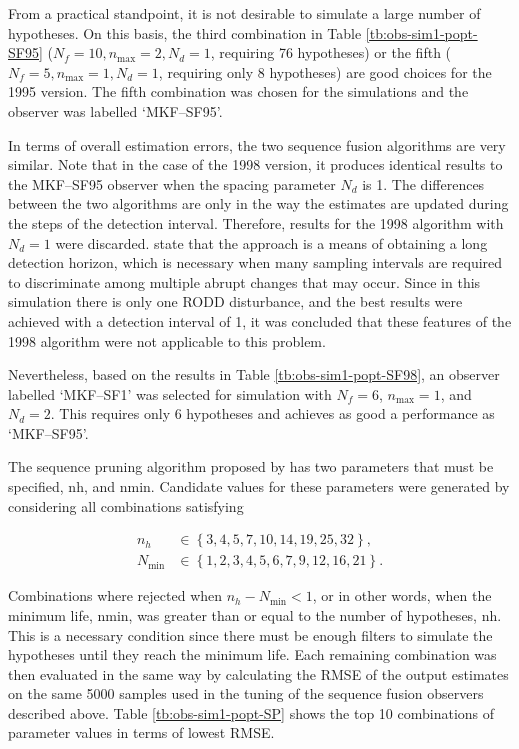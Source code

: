 From a practical standpoint, it is not desirable to simulate a large number of hypotheses. On this basis, the third combination in Table \ref{tb:obs-sim1-popt-SF95} ($N_f=10,n_\text{max}=2,N_d=1$, requiring 76 hypotheses) or the fifth ($N_f=5,n_\text{max}=1,N_d=1$, requiring only 8 hypotheses) are good choices for the 1995 version. The fifth combination was chosen for the simulations and the observer was labelled `MKF--SF95'. 

In terms of overall estimation errors, the two sequence fusion algorithms are very similar. Note that in the case of the 1998 version, it produces identical results to the MKF--SF95 observer when the spacing parameter $N_d$ is 1. The differences between the two algorithms are only in the way the estimates are updated during the steps of the detection interval. Therefore, results for the 1998 algorithm with $N_d=1$ were discarded. \cite{robertson_method_1998} state that the approach is a means of obtaining a long detection horizon, which is necessary when many sampling intervals are required to discriminate among multiple abrupt changes that may occur. Since in this simulation there is only one RODD disturbance, and the best results were achieved with a detection interval of 1, it was concluded that these features of the 1998 algorithm were not applicable to this problem.

Nevertheless, based on the results in Table \ref{tb:obs-sim1-popt-SF98}, an observer labelled `MKF--SF1' was selected for simulation with $N_f=6$, $n_\text{max}=1$, and $N_d=2$. This requires only 6 hypotheses and achieves as good a performance as `MKF--SF95'.

The sequence pruning algorithm proposed by \cite{eriksson_classification_1996} has two parameters that must be specified, \gls{nh}, and \gls{nmin}. Candidate values for these parameters were generated by considering all combinations satisfying

\begin{equation} \label{eq:sim-sys-siso-MKF-SP-param-values}
	\begin{aligned}
		n_h &\in \left\{3, 4, 5, 7, 10, 14, 19, 25, 32\right\},  \\
			N_\text{min} &\in \left\{1, 2, 3, 4, 5, 6, 7, 9, 12, 16, 21\right\}.
	\end{aligned}
\end{equation}

Combinations where rejected when $n_h - N_\text{min} < 1$, or in other words, when the minimum life, \gls{nmin}, was greater than or equal to the number of hypotheses, \gls{nh}. This is a necessary condition since there must be enough filters to simulate the hypotheses until they reach the minimum life. Each remaining combination was then evaluated in the same way by calculating the \gls{RMSE} of the output estimates on the same 5000 samples used in the tuning of the sequence fusion observers described above. Table \ref{tb:obs-sim1-popt-SP} shows the top 10 combinations of parameter values in terms of lowest \gls{RMSE}.

